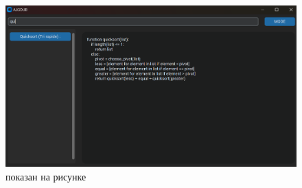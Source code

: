 \begin{enumerate}
	\begin{figure}[H]
		\centering
		\includegraphics[width=0.7\linewidth]{images/delete}
		\caption{показан на рисунке }
		\label{fig:classdiag}
	\end{figure}
	
	
	
\end{enumerate}
